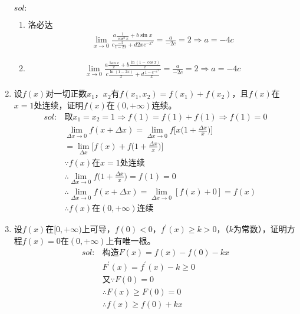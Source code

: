 \begin{enumerate}[{例}1.]
        $sol:$
        \begin{enumerate}[$1^\circ$]
            \item 洛必达
                \begin{align*}
                    \lim_{x \to 0}\frac{a\frac{1}{\cos ^2 x}+b\sin x}{c\frac{-2}{1-2x}+d2xe^{-x^2}}=\frac{a}{-2c}=2\Rightarrow a=-4c
                \end{align*}
            \item
                \begin{align*}
                    \lim_{x \to 0}\frac{a\frac{\tan x}{x}+b\frac{\ln(1-\cos x)}{x}}{c\frac{\ln(1-2x)}{x}+d\frac{1-e^{-x^2}}{x}}=\frac{a}{-2c}=2\Rightarrow a=-4c
                \end{align*}
        \end{enumerate}
    \item 设$f(x)$对一切正数$x_1$，$x_2$有$f(x_1,x_2)=f(x_1)+f(x_2)$，且$f(x)$在$x=1$处连续，证明$f(x)$在$(0,+\infty)$连续。
        \begin{align*}
            sol:&\mbox{取}x_1 = x_2 =1\Rightarrow f(1)=f(1)+f(1)\Rightarrow f(1)=0\\
                &\lim_{\Delta x\to 0}f(x+\Delta x)=\lim_{\Delta x\to 0}f\bigg[x\Big(1+\frac{\Delta x}{x}\Big)\bigg]\\
                &=\lim_{\Delta x}\bigg[f(x)+f\Big(1+\frac{\Delta x}{x}\Big)\bigg]\\
                &\because f(x)\mbox{在}x=1\mbox{处连续}\\
                &\therefore \lim_{\Delta x\to 0}f\Big(1+\frac{\Delta x}{x}\Big)=f(1)=0\\
                &\therefore \lim_{\Delta x\to 0}f(x+\Delta x)=\lim_{\Delta x\to 0}[f(x)+0]=f(x)\\
                &\therefore f(x)\mbox{在}(0,+\infty)\mbox{连续}
        \end{align*}
    \item 设$f(x)$在$[0,+\infty)$上可导，$f(0)<0$，$f^{\prime}(x)\geq k>0$，（$k$为常数），证明方程$f(x)=0$在$(0,+\infty)$上有唯一根。
        \begin{align*}
            sol:&\mbox{构造}F(x)=f(x)-f(0)-kx\\
                &F^{\prime}(x)=f^{\prime}(x)-k\geq 0\\
                &\mbox{又}\because F(0)=0\\
                &\therefore F(x)\geq F(0)=0\\
                &\therefore f(x)\geq f(0)+kx\\

\end{align*}
\end{enumerate}
